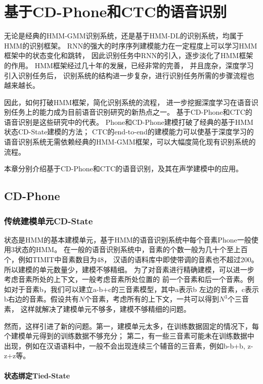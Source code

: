 ﻿%

\chapter{基于CD-Phone和CTC的语音识别}

无论是经典的HMM-GMM识别系统，还是基于HMM-DL的识别系统，均属于HMM的识别框架。
RNN的强大的时序序列建模能力在一定程度上可以学习HMM框架中的状态变化和跳转，
因此识别任务中RNN的引入，逐步淡化了HMM框架的作用。
HMM框架经过几十年的发展，已经非常的完善，
并且庞杂，深度学习引入识别任务后，
识别系统的结构进一步复杂，进行识别任务所需的步骤流程也越来越长。

因此，如何打破HMM框架，简化识别系统的流程，
进一步挖掘深度学习在语音识别任务上的能力成为目前语音识别研究的新热点之一。
基于CD-Phone和CTC的语音识别是这些研究中的代表。
Phone和CD-Phone建模打破了经典的基于HMM状态CD-State建模的方法；
CTC的end-to-end的建模能力可以使基于深度学习的语音识别系统无需依赖经典的HMM-GMM框架，可以大幅度简化现有识别系统的流程。

本章分别介绍基于CD-Phone和CTC的语音识别，及其在声学建模中的应用。

\section{CD-Phone}

\subsection{传统建模单元CD-State} \label{seg:cdstate}

状态是HMM的基本建模单元，基于HMM的语音识别系统中每个音素Phone一般使用3状态的HMM。
在一般的语音识别系统中，音素的个数一般为几十个至上百个，例如TIMIT中音素数目为48，
汉语的语料库中即使带调的音素也不超过200。所以建模的单元数量少，建模不够精细。
为了对音素进行精确建模，可以进一步考虑音素所处的上下文，一般考虑音素所处位置的
前一个音素和后一个音素。例如对于音素b，我们可以建立a-b+c的三音素模型，其中a表示b
左边的音素，c表示b右边的音素。假设共有$N$个音素，考虑所有的上下文，一共可以得到$N^3$个三音素，
这样就解决了建模单元不够多，建模不够精细的问题。

然而，这样引进了新的问题。第一，建模单元太多，在训练数据固定的情况下，每个建模单元得到的训练数据不够充分；
第二，有一些三音素可能未在训练数据中出现，例如在汉语语料中，一般不会出现连续三个辅音的三音素，例如b-b+b,
z-z+z等。

\subsubsection{状态绑定Tied-State}

